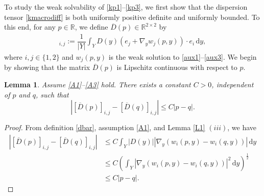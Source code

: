 \documentclass[11pt]{article}
\newtheorem{lemma}{Lemma}
\newcommand{\di}[1]{\,\mathrm{d}#1}
\begin{document}
\par To study the weak solvability of \eqref{kp1}--\eqref{kp3}, we first show that the dispersion tensor \eqref{kmacrodiff} is both uniformly positive definite and uniformly bounded.
To this end, for any $p\in\mathbb{R}$, we define $\overline{D}(p)\in \mathbb{R}^{2\times 2}$ by
\begin{align}
    [\overline{D}(p)]_{i,j}:=\dfrac{1}{|Y|}\int_Y D(y)\left(e_j+\nabla_y w_j (p,y)\right) \cdot e_i\di{y},\label{dbar}
\end{align}
where $i,j\in \{1,2\}$ and $w_j(p,y)$ is the weak solution to \eqref{aux1}--\eqref{aux3}.  
We begin by showing that the matrix $\overline{D}(p)$ is Lipschitz continuous with respect to $p$.
\begin{lemma}\label{L3}
    {Assume \ref{A1}--\ref{A3}} hold.
    There exists a constant $C>0$, independent of $p$ and $q$, such that 
 \begin{equation*}
     |[\overline{D}(p)]_{i,j}-[\overline{D}(q)]_{i,j}|\leq C |p-q|.
 \end{equation*}
\end{lemma}
\begin{proof}
     From definition \eqref{dbar}, assumption \ref{A1}, and Lemma \ref{L1} $(iii)$, we have
\begin{align}
     |[\overline{D}(p)]_{i,j}-[\overline{D}(q)]_{i,j}|&\leq C \int_Y |D(y)|\left|\nabla_y( w_i(p,y)-w_i(q,y))\right|\di{y}\nonumber\\
     &\leq C \left(\int_Y |\nabla_y( w_i(p,y)-w_i(q,y))|^2 \di{y}\right)^{\frac{1}{2}}\nonumber\\
     &\leq  C|p-q|.\label{p1}
 \end{align}
\end{proof}
\end{document}
